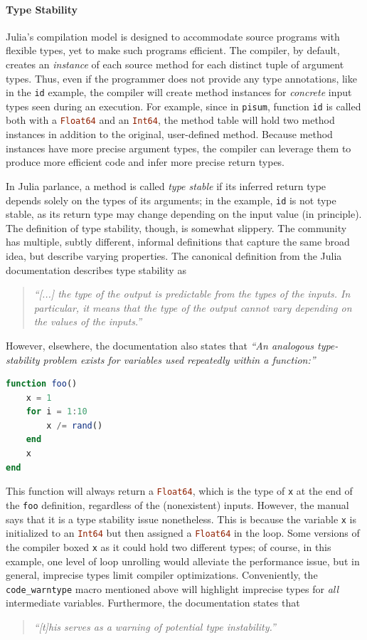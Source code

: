 \documentclass[oneside,openright,titlepage,numbers=noenddot,%
headinclude,footinclude,cleardoublepage=empty,abstract=on,
BCOR=5mm,paper=a4,fontsize=11pt,
dvipsnames
]{scrreprt}
\renewcommand{\c}[1]{\lstinline[language=Julia]!#1!\xspace}
\begin{document}
\paragraph{Type Stability}
Julia's compilation model is designed to accommodate source programs
with flexible types, yet to make such programs efficient. The compiler, by
default, creates an \emph{instance} of each source method for each distinct tuple of
argument types. Thus, even if the programmer does not provide any type
annotations, like in the \c{id} example, the compiler will create method
instances for \emph{concrete} input types seen during
an execution. For example, since in \c{pisum}, function \c{id} is called both
with a \c{Float64} and an \c{Int64}, the method table will hold two method instances
in addition to the original, user-defined method.
Because method instances have more precise argument types, the compiler can
leverage them to produce more efficient code and infer more precise return types.

In Julia parlance, a method is called \emph{type stable} if its inferred
return type depends solely on the types of its arguments; in the
example, \c{id} is not type stable, as its return type may change depending on
the input value (in principle). The definition of type stability, though, is somewhat slippery.
The community has multiple, subtly different, informal definitions that capture
the same broad idea, but describe varying properties. The canonical definition
from the Julia documentation describes type stability as

\begin{quote}
  \itshape``[...] the type of the output is predictable from the types of the
  inputs. In particular, it means that the type of the output cannot vary
  depending on the values of the inputs.''
\end{quote}
However, elsewhere, the documentation also states that \emph{``An analogous
type-stability problem exists for variables used repeatedly within a
function:''}
\begin{lstlisting}[basicstyle=\footnotesize\ttfamily,language=julia]
function foo()
    x = 1
    for i = 1:10
        x /= rand()
    end
    x
end
\end{lstlisting}
This function will always return a \c{Float64}, which is the type of \c{x}
at the end of the \c{foo} definition, regardless of the (nonexistent)
inputs. However, the manual says that it is a type stability issue nonetheless.
This is because the variable \c{x} is initialized to an \c{Int64} but then
assigned a \c{Float64} in the loop. Some versions of the compiler boxed \c{x} as
it could hold two different types; of course, in this example, one level of loop
unrolling would alleviate the performance issue, but in general,
imprecise types limit compiler optimizations.
Conveniently, the \c{code_warntype} macro mentioned above
will highlight imprecise types for \emph{all} intermediate variables.
Furthermore, the documentation states that
\begin{quote}
  \itshape ``[t]his serves as a warning of potential type instability.''
\end{quote}
\end{document}
